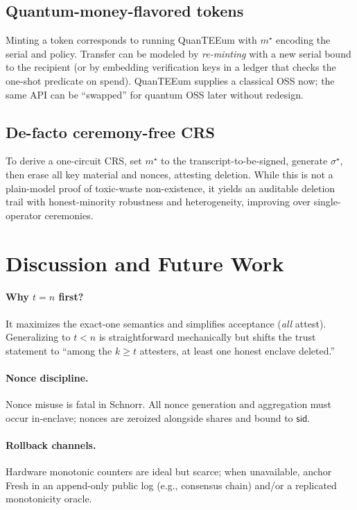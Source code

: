 \documentclass[runningheads,orivec]{llncs}
\newcommand{\prot}{\textsf{QuanTEEum}}
\newcommand{\sid}{\mathsf{sid}}
\begin{document}
\subsection{Quantum-money-flavored tokens}
Minting a token corresponds to running \prot{} with $m^{\star}$ encoding the serial and policy. Transfer can be modeled by \emph{re-minting} with a new serial bound to the recipient (or by embedding verification keys in a ledger that checks the one-shot predicate on spend). \prot{} supplies a classical OSS now; the same API can be “swapped” for quantum OSS later without redesign.

\subsection{De-facto ceremony-free CRS}
To derive a one-circuit CRS, set $m^{\star}$ to the transcript-to-be-signed, generate $\sigma^{\star}$, then erase all key material and nonces, attesting deletion. While this is not a plain-model proof of toxic-waste non-existence, it yields an auditable deletion trail with honest-minority robustness and heterogeneity, improving over single-operator ceremonies.

\section{Discussion and Future Work}\label{sec:discussion}
\paragraph{Why $t\!=\!n$ first?}
It maximizes the exact-one semantics and simplifies acceptance (\emph{all} attest). Generalizing to $t<n$ is straightforward mechanically but shifts the trust statement to “among the $k\!\ge\!t$ attesters, at least one honest enclave deleted.”

\paragraph{Nonce discipline.}
Nonce misuse is fatal in Schnorr. All nonce generation and aggregation must occur in-enclave; nonces are zeroized alongside shares and bound to $\sid$.

\paragraph{Rollback channels.}
Hardware monotonic counters are ideal but scarce; when unavailable, anchor \textsf{Fresh} in an append-only public log (e.g., consensus chain) and/or a replicated monotonicity oracle.
\end{document}
